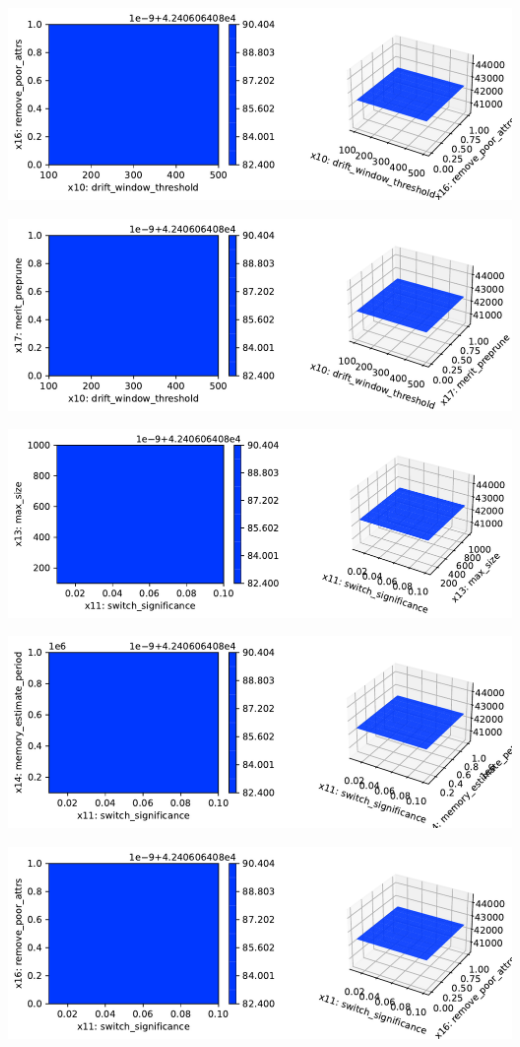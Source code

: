 \documentclass[
  letterpaper,
  DIV=11,
  numbers=noendperiod]{scrreprt}
\begin{document}
\includegraphics{024_spot_hpt_river_friedman_hatr_files/figure-pdf/cell-42-output-95.pdf}

\includegraphics{024_spot_hpt_river_friedman_hatr_files/figure-pdf/cell-42-output-96.pdf}

\includegraphics{024_spot_hpt_river_friedman_hatr_files/figure-pdf/cell-42-output-97.pdf}

\includegraphics{024_spot_hpt_river_friedman_hatr_files/figure-pdf/cell-42-output-98.pdf}

\includegraphics{024_spot_hpt_river_friedman_hatr_files/figure-pdf/cell-42-output-99.pdf}
\end{document}
